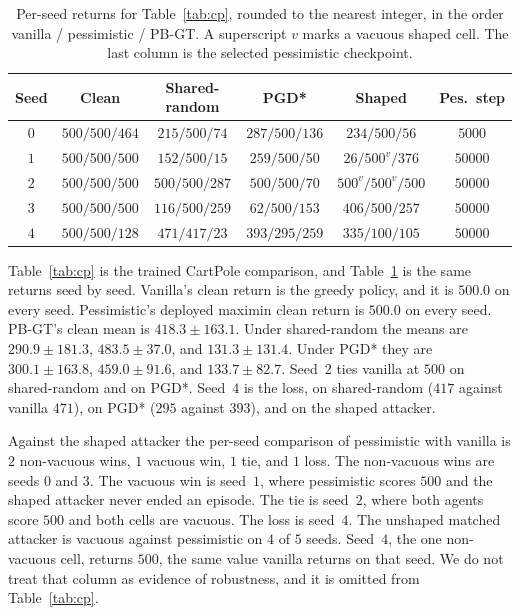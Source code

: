 \documentclass[10pt,twocolumn]{article}
\begin{document}
\begin{table}[t]
\centering
\small
\caption{Per-seed returns for Table~\ref{tab:cp}, rounded to the nearest integer, in the order vanilla / pessimistic / PB-GT.
A superscript $v$ marks a vacuous shaped cell.
The last column is the selected pessimistic checkpoint.}
\label{tab:cp-seeds}
\setlength{\tabcolsep}{4pt}
\begin{tabular}{@{}cccccc@{}}
\toprule
Seed & Clean & Shared-random & PGD* & Shaped & Pes.\ step \\
\midrule
$0$ & $500/500/464$ & $215/500/74$ & $287/500/136$ & $234/500/56$ & $5000$ \\
$1$ & $500/500/500$ & $152/500/15$ & $259/500/50$ & $26/500^{v}/376$ & $50000$ \\
$2$ & $500/500/500$ & $500/500/287$ & $500/500/70$ & $500^{v}/500^{v}/500$ & $50000$ \\
$3$ & $500/500/500$ & $116/500/259$ & $62/500/153$ & $406/500/257$ & $50000$ \\
$4$ & $500/500/128$ & $471/417/23$ & $393/295/259$ & $335/100/105$ & $50000$ \\
\bottomrule
\end{tabular}
\end{table}

Table~\ref{tab:cp} is the trained CartPole comparison, and Table~\ref{tab:cp-seeds} is the same returns seed by seed.
Vanilla's clean return is the greedy policy, and it is $500.0$ on every seed.
Pessimistic's deployed maximin clean return is $500.0$ on every seed.
PB-GT's clean mean is $418.3{\pm}163.1$.
Under shared-random the means are $290.9{\pm}181.3$, $483.5{\pm}37.0$, and $131.3{\pm}131.4$.
Under PGD* they are $300.1{\pm}163.8$, $459.0{\pm}91.6$, and $133.7{\pm}82.7$.
Seed~$2$ ties vanilla at $500$ on shared-random and on PGD*.
Seed~$4$ is the loss, on shared-random ($417$ against vanilla $471$), on PGD* ($295$ against $393$), and on the shaped attacker.

Against the shaped attacker the per-seed comparison of pessimistic with vanilla is $2$ non-vacuous wins, $1$ vacuous win, $1$ tie, and $1$ loss.
The non-vacuous wins are seeds $0$ and $3$.
The vacuous win is seed~$1$, where pessimistic scores $500$ and the shaped attacker never ended an episode.
The tie is seed~$2$, where both agents score $500$ and both cells are vacuous.
The loss is seed~$4$.
The unshaped matched attacker is vacuous against pessimistic on $4$ of $5$ seeds.
Seed~$4$, the one non-vacuous cell, returns $500$, the same value vanilla returns on that seed.
We do not treat that column as evidence of robustness, and it is omitted from Table~\ref{tab:cp}.
\end{document}
